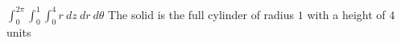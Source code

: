 {$\int_{0}^{2\pi} \int_{0}^{1} \int_{0}^{4} r \: dz \: dr \: d\theta$
}
{The solid is the full cylinder of radius $1$ with a height of $4$ units}